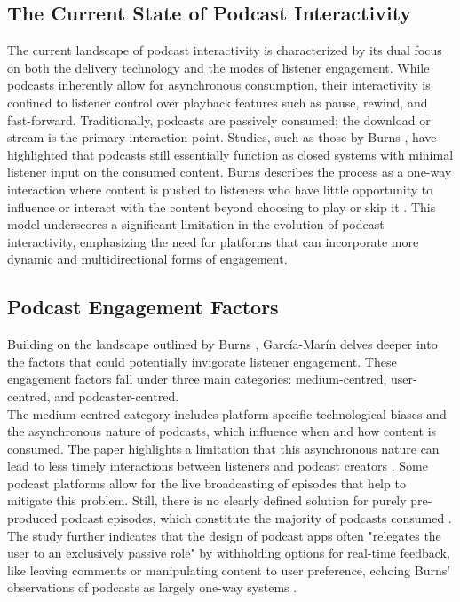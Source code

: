 \documentclass[12pt]{report}
\begin{document}
\begin{myfont}
        \section{The Current State of Podcast Interactivity}
        \indent The current landscape of podcast interactivity is characterized by its dual focus on both the delivery technology and the modes of listener engagement. While podcasts inherently allow for asynchronous consumption, their interactivity is confined to listener control over playback features such as pause, rewind, and fast-forward. Traditionally, podcasts are passively consumed; the download or stream is the primary interaction point. Studies, such as those by Burns \citep{Burns2010The}, have highlighted that podcasts still essentially function as closed systems with minimal listener input on the consumed content. Burns describes the process as a one-way interaction where content is pushed to listeners who have little opportunity to influence or interact with the content beyond choosing to play or skip it \citep{Burns2010The}. This model underscores a significant limitation in the evolution of podcast interactivity, emphasizing the need for platforms that can incorporate more dynamic and multidirectional forms of engagement.
        
        \subsection{Podcast Engagement Factors}
        \indent Building on the landscape outlined by Burns \citep{Burns2010The}, García-Marín \citep{GarciaMarin2020} delves deeper into the factors that could potentially invigorate listener engagement. These engagement factors fall under three main categories: medium-centred, user-centred, and podcaster-centred. \\
        \indent The medium-centred category includes platform-specific technological biases and the asynchronous nature of podcasts, which influence when and how content is consumed. The paper highlights a limitation that this asynchronous nature can lead to less timely interactions between listeners and podcast creators \citep{GarciaMarin2020}. Some podcast platforms allow for the live broadcasting of episodes that help to mitigate this problem. Still, there is no clearly defined solution for purely pre-produced podcast episodes, which constitute the majority of podcasts consumed \citep{GrandViewResearch2023}. The study further indicates that the design of podcast apps often "relegates the user to an exclusively passive role" by withholding options for real-time feedback, like leaving comments or manipulating content to user preference, echoing Burns' observations of podcasts as largely one-way systems \citep{GarciaMarin2020}\citep{Burns2010The}. 
        

\end{myfont}
\end{document}
